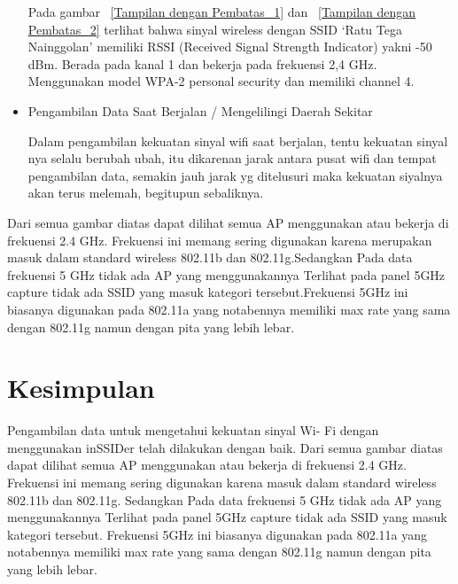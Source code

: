 \documentclass[conference]{IEEEtran}
\begin{document}
\begin{itemize}
\vspace{0.2cm}

Pada gambar ~\ref{Tampilan dengan Pembatas_1} dan ~\ref{Tampilan dengan Pembatas_2} terlihat bahwa sinyal wireless
dengan SSID ‘Ratu Tega Nainggolan’ memiliki RSSI (Received Signal Strength Indicator) yakni -50 dBm.
Berada pada kanal 1 dan bekerja pada frekuensi 2,4
GHz. Menggunakan model WPA-2 personal security dan
memiliki channel 4.
\vspace{0.2cm}

    \item Pengambilan Data Saat Berjalan / Mengelilingi Daerah
    Sekitar

\vspace{0.2cm}

Dalam pengambilan kekuatan sinyal wifi saat berjalan,
tentu kekuatan sinyal nya selalu berubah ubah, itu
dikarenan jarak antara pusat wifi dan tempat pengambilan
data, semakin jauh jarak yg ditelusuri maka kekuatan
siyalnya akan terus melemah, begitupun sebaliknya.
\end{itemize}

\vspace{0.2cm}
Dari semua gambar diatas dapat dilihat semua AP menggunakan
atau bekerja di frekuensi 2.4 GHz. Frekuensi
ini memang sering digunakan karena merupakan masuk
dalam standard wireless 802.11b dan 802.11g.Sedangkan
Pada data frekuensi 5 GHz tidak ada AP yang
menggunakannya Terlihat pada panel 5GHz capture
tidak ada SSID yang masuk kategori tersebut.Frekuensi
5GHz ini biasanya digunakan pada 802.11a yang notabennya
memiliki max rate yang sama dengan 802.11g
namun dengan pita yang lebih lebar.


\section{Kesimpulan}
Pengambilan data untuk mengetahui kekuatan sinyal Wi-
Fi dengan menggunakan inSSIDer telah dilakukan dengan
baik. Dari semua gambar diatas dapat dilihat semua AP
menggunakan atau bekerja di frekuensi 2.4 GHz. Frekuensi ini
memang sering digunakan karena masuk dalam standard wireless
802.11b dan 802.11g. Sedangkan Pada data frekuensi 5 GHz tidak ada AP yang menggunakannya Terlihat pada panel
5GHz capture tidak ada SSID yang masuk kategori tersebut.
Frekuensi 5GHz ini biasanya digunakan pada 802.11a yang
notabennya memiliki max rate yang sama dengan 802.11g
namun dengan pita yang lebih lebar.
\end{document}
